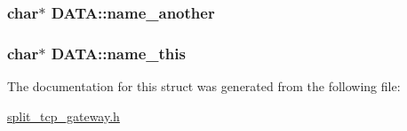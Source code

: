 \hypertarget{structDATA_a81d07e70e9d1fdabf83cacd194606190}{
\subsubsection[{name\-\_\-another}]{\setlength{\rightskip}{0pt plus 5cm}char$\ast$ {\bf \-D\-A\-T\-A\-::name\-\_\-another}}}\label{structDATA_a81d07e70e9d1fdabf83cacd194606190}
\hypertarget{structDATA_af8b5b656a5e237ad7d2f5cdcca9fcce4}{
\subsubsection[{name\-\_\-this}]{\setlength{\rightskip}{0pt plus 5cm}char$\ast$ {\bf \-D\-A\-T\-A\-::name\-\_\-this}}}\label{structDATA_af8b5b656a5e237ad7d2f5cdcca9fcce4}


\-The documentation for this struct was generated from the following file\-:\begin{DoxyCompactItemize}
\item 
\hyperlink{split__tcp__gateway_8h}{split\-\_\-tcp\-\_\-gateway.\-h}\end{DoxyCompactItemize}
